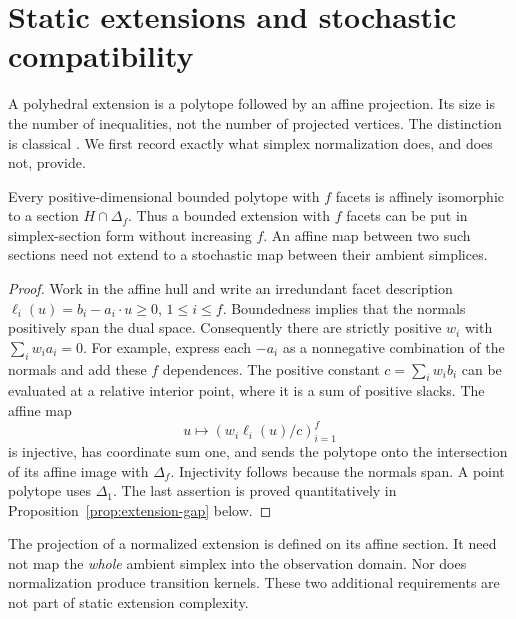 \section{Static extensions and stochastic compatibility}\label{sec:lifts}
A polyhedral extension is a polytope followed by an affine projection.
Its size is the number of inequalities, not the number of projected
vertices. The distinction is classical \cite{Yannakakis,FRT}. We first
record exactly what simplex normalization does, and does not, provide.

\begin{proposition}\label{prop:slack}
Every positive-dimensional bounded polytope with $f$ facets is affinely
isomorphic to a section $H\cap\Delta_f$. Thus a bounded extension with
$f$ facets can be put in simplex-section form without increasing $f$.
An affine map between two such sections need not extend to a stochastic
map between their ambient simplices.
\end{proposition}
\begin{proof}
Work in the affine hull and write an irredundant facet description
$\ell_i(u)=b_i-a_i\cdot u\ge0$, $1\le i\le f$.
Boundedness implies that the normals positively span the dual space.
Consequently there are strictly positive $w_i$ with
$\sum_i w_i a_i=0$. For example, express each $-a_i$ as a nonnegative
combination of the normals and add these $f$ dependences.
The positive constant $c=\sum_iw_i b_i$ can be evaluated at a relative
interior point, where it is a sum of positive slacks. The affine map
\[
                     u\longmapsto (w_i\ell_i(u)/c)_{i=1}^f
\]
is injective, has coordinate sum one, and sends the polytope onto the
intersection of its affine image with $\Delta_f$. Injectivity follows
because the normals span. A point polytope uses $\Delta_1$.
The last assertion is proved quantitatively in
Proposition~\ref{prop:extension-gap} below.
\end{proof}

The projection of a normalized extension is defined on its affine
section. It need not map the \emph{whole} ambient simplex into the
observation domain. Nor does normalization produce transition kernels.
These two additional requirements are not part of static extension
complexity.

